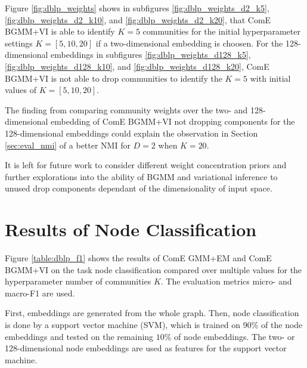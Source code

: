 \documentclass[conference]{IEEEtran}
\begin{document}
Figure \ref{fig:dblp_weights} shows in subfigures \ref{fig:dblp_weights_d2_k5}, \ref{fig:dblp_weights_d2_k10}, and \ref{fig:dblp_weights_d2_k20}, that ComE BGMM+VI is able to identify $K=5$ communities for the initial hyperparameter settings $K=[5, 10, 20]$ if a two-dimensional embedding is choosen. For the 128-dimensional embeddings in subfigures \ref{fig:dblp_weights_d128_k5}, \ref{fig:dblp_weights_d128_k10}, and \ref{fig:dblp_weights_d128_k20}, ComE BGMM+VI is not able to drop communities to identify the $K=5$ with initial values of $K=[5,10,20]$.

The finding from comparing community weights over the two- and 128-dimensional embedding of ComE BGMM+VI not dropping components for the 128-dimensional embeddings could explain the observation in Section \ref{sec:eval_nmi} of a better NMI for $D=2$ when $K=20$.

It is left for future work to consider different weight concentration priors and further explorations into the ability of BGMM and variational inference to unused drop components dependant of the dimensionality of input space.


\section{Results of Node Classification}

Figure \ref{table:dblp_f1} shows the results of ComE GMM+EM and ComE BGMM+VI on the task node classification compared over multiple values for the hyperparameter number of communities $K$. The evaluation metrics micro- and macro-F1 are used.

First, embeddings are generated from the whole graph. Then, node classification is done by a support vector machine (SVM), which is trained on $90\%$ of the node embeddings and tested on the remaining $10\%$ of node embeddings. The two- or 128-dimensional node embeddings are used as features for the support vector machine.
\end{document}
